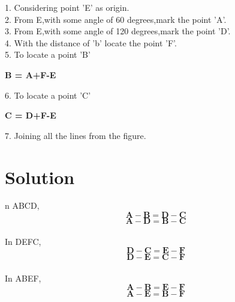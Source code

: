 \documentclass[10pt,a4paper]{report}
\newcommand{\myvec}[1]{\ensuremath{\begin{pmatrix}#1\end{pmatrix}}}
\let\vec\mathbf
\let\myvec\bf
\let\vec\mathbf
\begin{document}
\begin{multicols}{2}
1. Considering point 'E' as origin.\\
2. From E,with some angle of 60 degrees,mark the point 'A'.\\
3. From E,with some angle of 120 degrees,mark the point 'D'.\\
4. With the distance of 'b' locate the point 'F'.\\
5. To locate a point 'B'\\
\begin{center}
    \myvec{ B = A+F-E }
\end{center}
6. To locate a point 'C'\\
\begin{center}
    \myvec{ C = D+F-E }
\end{center}
7. Joining all the lines from the figure.
\vspace{0.5cm}\\
 \section{Solution}
n ABCD,
\begin{equation}
\vec{A-B}=\vec{D-C}
\end{equation}
\begin{equation}
\vec{A-D}=\vec{B-C}
\end{equation}
\\
In DEFC,
\begin{equation}
\vec{D-C}=\vec{E-F}
\end{equation}
\begin{equation}
\vec{D-E}=\vec{C-F}
\end{equation}
\\
In ABEF,
\begin{equation}
\vec{A-B}=\vec{E-F}
\end{equation}
\begin{equation}
\vec{A-E}=\vec{B-F}
\end{equation}

\vspace{1mm}


\end{multicols}
\end{document}
